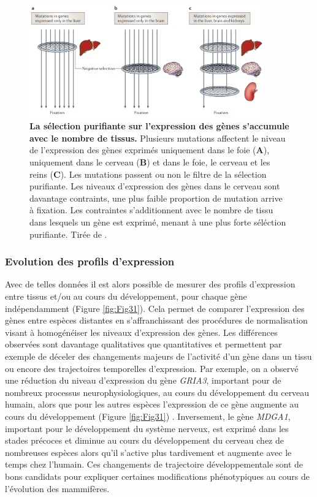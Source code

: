 \begin{figure}[h]
 \centering
 \includegraphics[width=0.9\textwidth, page=1] {figures/introduction/fig30.png}
 \caption[La sélection purifiante sur l'expression des gènes s'accumule avec le nombre de tissus.]{
 \textbf{La sélection purifiante sur l'expression des gènes s'accumule avec le nombre de tissus.}
 Plusieurs mutations affectent le niveau de l'expression des gènes exprimés uniquement dans le foie (\textbf{A}), uniquement dans le cerveau (\textbf{B}) et dans le foie, le cerveau et les reins (\textbf{C}). Les mutations passent ou non le filtre de la sélection purifiante. Les niveaux d'expression des gènes dans le cerveau sont davantage contraints, une plus faible proportion de mutation arrive à fixation. Les contraintes s'additionnent avec le nombre de tissu dans lesquels un gène est exprimé, menant à une plus forte séléction purifiante. Tirée de \citet{khaitovich_evolution_2006}.\\
 }
 \label{fig:Fig30}
\end{figure}

\subsubsection{Evolution des profils d’expression}
\label{subsub:evol-profil}

Avec de telles données il est alors possible de mesurer des profils d’expression entre tissus et/ou au cours du développement, pour chaque gène indépendamment (Figure \ref{fig:Fig31}). Cela permet de comparer l’expression des gènes entre espèces distantes en s’affranchissant des procédures de normalisation visant à homogénéiser les niveaux d’expression des gènes. Les différences observées sont davantage qualitatives que quantitatives et permettent par exemple de déceler des changements majeurs de l’activité d’un gène dans un tissu ou encore des trajectoires temporelles d’expression. Par exemple, on a observé une réduction du niveau d’expression du gène \textit{GRIA3}, important pour de nombreux processus neurophysiologiques, au cours du développement du cerveau humain, alors que pour les autres espèces l’expression de ce gène augmente au cours du développement (Figure \ref{fig:Fig31}) \citep{cardoso-moreira_gene_2019}. Inversement, le gène \textit{MDGA1}, important pour le développement du système nerveux, est exprimé dans les stades précoces et diminue au cours du développement du cerveau chez de nombreuses espèces alors qu’il s’active plus tardivement et augmente avec le temps chez l’humain. Ces changements de trajectoire développementale sont de bons candidats pour expliquer certaines modifications phénotypiques au cours de l’évolution des mammifères.

